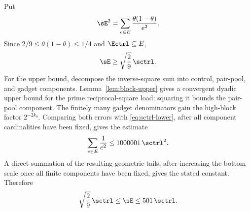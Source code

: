 Put
\begin{equation}\label{eq:sigmaE}
 \sE^2=\sum_{e\in E}\frac{\theta(1-\theta)}{e^2}.
\end{equation}
Since $2/9\le\theta(1-\theta)\le1/4$ and $\Ectrl\subseteq E$,
\begin{equation}\label{eq:variance-lower}
 \sE\ge\sqrt{\frac29}\,\sctrl.
\end{equation}
For the upper bound, decompose the inverse-square sum into control, pair-pool,
and gadget components.  Lemma~\ref{lem:block-upper} gives a convergent dyadic
upper bound for the prime reciprocal-square load; squaring it bounds the
pair-pool component.  The finitely many gadget denominators gain the high-block
factor $2^{-2k_0}$.  Comparing both errors with
\eqref{eq:sctrl-lower}, after all component cardinalities have been fixed, gives
the estimate
\begin{equation}\label{eq:inverse-square-constant}
 \sum_{e\in E}\frac1{e^2}
 \le1000001\,\sctrl^2.
\end{equation}
A direct summation of the resulting geometric tails, after increasing the
bottom scale once all finite components have been fixed, gives the stated
constant.  Therefore
\begin{equation}\label{eq:variance-comparison}
 \sqrt{\frac29}\,\sctrl
 \le\sE\le501\,\sctrl.
\end{equation}


